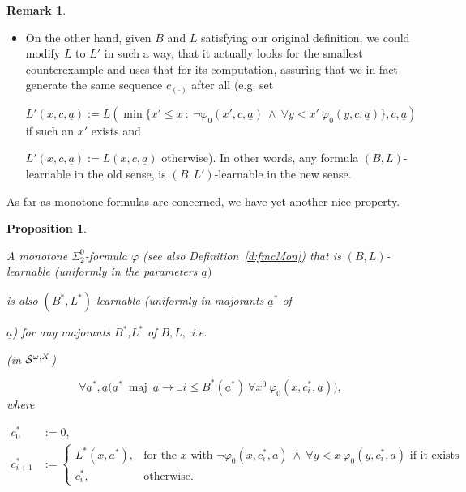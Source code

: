 \documentclass[1p]{elsarticle}
\DeclareMathOperator{\maj}{maj} %
\newcommand{\tup}{\underline} %
\newcommand{\Telse}{\text{otherwise}}
\theoremstyle{plain}
\newtheorem{prop}[thm]{Proposition}
\theoremstyle{definition}
\newtheorem{rmk}[thm]{Remark}
\theoremstyle{remark}
\renewcommand{\phi}{\varphi}
\theoremstyle{definition}
\begin{document}
\begin{rmk}
\begin{itemize}
\item On the other hand, given $B$ and $L$ satisfying our original definition, we could modify $L$ to $L'$ in such a way, that it actually looks for the smallest counterexample and uses that for its computation, assuring that we in fact generate the same sequence $c_{(\cdot)}$ after all (e.g. set 

$L'(x,c,\tup a):=L(\min \{x'\leq x\ :\  \neg\phi_0(x',c,\tup a)\ \wedge\ \forall y<x'\ \phi_0(y,c,\tup a)\},c,\tup a)$ if such an $x'$ exists and 

$L'(x,c,\tup a):=L(x,c,\tup a)$ otherwise). In other words, any formula $(B,L)$-learnable in the old sense, is $(B,L')$-learnable in the new sense.

\end{itemize}

\end{rmk}



As far as monotone formulas are concerned, we have yet another nice property.

\begin{prop}\label{p:majBL}

A monotone $\Sigma^0_2$-formula $\phi$ (see also Definition~\ref{d:fmcMon}) that is $(B,L)$-learnable (uniformly in the parameters $\underline{a})$ 

is also $(B^*,L^*)$-learnable (uniformly in majorants $\tup a^*$ of 

$\tup a$) for any majorants $B^*$,$L^*$ of $B,L,$ i.e. 

(in ${\cal S}^{\omega,X}$)  

\[ \forall 

\underline{a}^*,\underline{a} \big( 

\underline{a}^* \ \maj\ \underline{a}\to 

\exists i\leq B^*(\tup a^*)\ \forall x^0\ \phi_0(x,c^*_i,\tup a)\big),\] where

\begin{align*}

c^*_0&:=0,\\

c^*_{i+1}&:=

\begin{cases}

L^*(x, \tup a^*),&\text{for the $x$ with } \neg\phi_0(x,c^*_i,\tup a)\ \wedge\ \forall y<x\ \phi_0(y,c^*_i,\tup a) \text{ if it exists}\\

c^*_i,&\Telse.

\end{cases}

\end{align*}

\end{prop}
\end{document}
